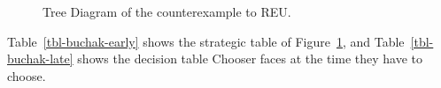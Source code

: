 \documentclass[
  10pt,
  letterpaper,
  DIV=11,
  numbers=noendperiod,
  twoside]{scrartcl}
\begin{document}
\begin{figure}


\caption{\label{fig-buchak}Tree Diagram of the counterexample to REU.}

\end{figure}%

Table~\ref{tbl-buchak-early} shows the strategic table of
Figure~\ref{fig-buchak}, and Table~\ref{tbl-buchak-late} shows the
decision table Chooser faces at the time they have to choose.
\end{document}
